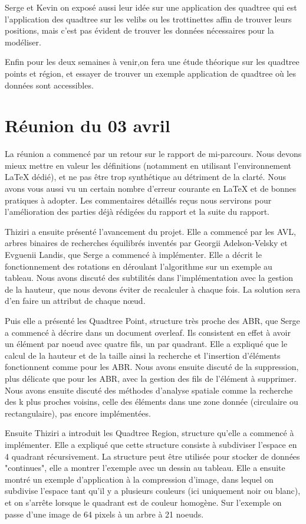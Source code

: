\documentclass{report}
\begin{document}
Serge et Kevin on exposé aussi leur idée sur une application des quadtree qui est l'application des quadtree sur les velibs ou les trottinettes affin de trouver leurs positions, 
mais c'est pas évident de trouver les données nécessaires pour la modéliser.

Enfin pour les deux semaines à venir,on fera une étude théorique sur les quadtree points et région, et essayer de trouver un exemple application de quadtree où les données sont accessibles.

\section{Réunion du 03 avril}
La réunion a commencé par un retour sur le rapport de mi-parcours. Nous devons mieux mettre en valeur les définitions (notamment en utilisant l'environnement LaTeX dédié), et ne pas être trop synthétique au détriment de la clarté. Nous avons vous aussi vu un certain nombre d'erreur courante en LaTeX et de bonnes pratiques à adopter. Les commentaires détaillés reçus nous servirons pour l'amélioration des parties déjà rédigées du rapport et la suite du rapport.

Thiziri a ensuite présenté l'avancement du projet. Elle a commencé par les AVL, arbres binaires de recherches équilibrés inventés par  Georgii Adelson-Velsky et Evguenii Landis, que Serge a commencé à implémenter. Elle a décrit le fonctionnement des rotations en déroulant l'algorithme sur un exemple au tableau. Nous avons discuté des subtilités dans l'implémentation avec la gestion de la hauteur, que nous devons éviter de recalculer à chaque fois. La solution sera d'en faire un attribut de chaque nœud.

Puis elle a présenté les Quadtree Point, structure très proche des ABR, que Serge a commencé à décrire dans un document overleaf. Ils consistent en effet à avoir un élément par noeud avec quatre fils, un par quadrant. Elle a expliqué que le calcul de la hauteur et de la taille ainsi la recherche et l'insertion d'éléments fonctionnent comme pour les ABR. Nous avons ensuite discuté de la suppression, plus délicate que pour les ABR, avec la gestion des fils de l'élément à supprimer. Nous avons ensuite discuté des méthodes d'analyse spatiale comme la recherche des k plus proches voisins, celle des éléments dans une zone donnée (circulaire ou rectangulaire), pas encore implémentées.

Ensuite Thiziri a introduit les Quadtree Region, structure qu'elle a commencé à implémenter. Elle a expliqué que cette structure consiste à subdiviser l'espace en 4 quadrant récursivement. La structure peut être utilisée pour stocker de données "continues", elle a montrer l'exemple avec un dessin au tableau. Elle a ensuite montré un exemple d'application à la compression d'image, dans lequel on subdivise l'espace tant qu'il y a plusieurs couleurs (ici uniquement noir ou blanc), et on s'arrête lorsque le quadrant est de couleur homogène. Sur l'exemple on passe d'une image de 64 pixels à un arbre à 21 noeuds.
\end{document}
